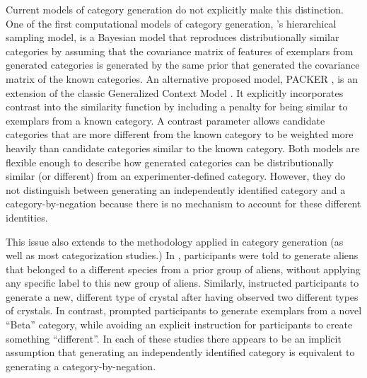 \documentclass[10pt,letterpaper]{article}
\begin{document}
Current models of category generation do not explicitly make this distinction. One of the first computational models of category generation, \cite{jern2013probabilistic}'s hierarchical sampling model, is a Bayesian model that reproduces distributionally similar categories by assuming that the covariance matrix of features of exemplars from generated categories is generated by the same prior that generated the covariance matrix of the known categories. An alternative proposed model, PACKER \citep{conaway2017packer}, is an extension of the classic Generalized Context Model \citep[GCM;][]{nosofsky1984choice,nosofsky1986attention}. It explicitly incorporates contrast into the similarity function by including a penalty for being similar to exemplars from a known category. A contrast parameter allows candidate categories that are more different from the known category to be weighted more heavily than candidate categories similar to the known category. Both models are flexible enough to describe how generated categories can be distributionally similar (or different) from an experimenter-defined category. However, they do not distinguish between  generating an independently identified category and a category-by-negation because there is no mechanism to account for these different identities. 

This issue also extends to the methodology applied in category generation (as well as most categorization studies.) In
\cite{ward1994structured}, participants were told to generate aliens that belonged to a different species from a prior
group of aliens, without applying any specific label to this new group of aliens. Similarly,
\cite{jern2013probabilistic} instructed participants to generate a new, different type of crystal after having observed
two different types of crystals. In contrast, \cite{conaway2017packer} prompted participants to generate exemplars from
a novel ``Beta'' category, while avoiding an explicit instruction for participants to create something ``different''. In
each of these studies there appears to be an implicit assumption that generating an independently identified category is equivalent to generating a category-by-negation.
\end{document}
